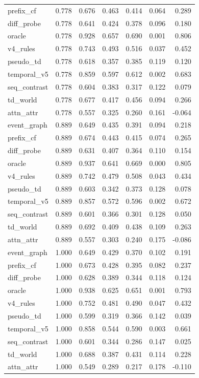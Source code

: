 \documentclass{article}
\begin{document}
\begin{longtable}{@{}lrrrrrr@{}}
prefix\_cf & 0.778 & 0.676 & 0.463 & 0.414 & 0.064 & 0.289 \\
diff\_probe & 0.778 & 0.641 & 0.424 & 0.378 & 0.096 & 0.180 \\
oracle & 0.778 & 0.928 & 0.657 & 0.690 & 0.001 & 0.806 \\
v4\_rules & 0.778 & 0.743 & 0.493 & 0.516 & 0.037 & 0.452 \\
pseudo\_td & 0.778 & 0.618 & 0.357 & 0.385 & 0.119 & 0.120 \\
temporal\_v5 & 0.778 & 0.859 & 0.597 & 0.612 & 0.002 & 0.683 \\
seq\_contrast & 0.778 & 0.604 & 0.383 & 0.317 & 0.122 & 0.079 \\
td\_world & 0.778 & 0.677 & 0.417 & 0.456 & 0.094 & 0.266 \\
attn\_attr & 0.778 & 0.557 & 0.325 & 0.260 & 0.161 & -0.064 \\
event\_graph & 0.889 & 0.649 & 0.435 & 0.391 & 0.094 & 0.218 \\
prefix\_cf & 0.889 & 0.674 & 0.443 & 0.415 & 0.074 & 0.265 \\
diff\_probe & 0.889 & 0.631 & 0.407 & 0.364 & 0.110 & 0.154 \\
oracle & 0.889 & 0.937 & 0.641 & 0.669 & 0.000 & 0.805 \\
v4\_rules & 0.889 & 0.742 & 0.479 & 0.508 & 0.043 & 0.434 \\
pseudo\_td & 0.889 & 0.603 & 0.342 & 0.373 & 0.128 & 0.078 \\
temporal\_v5 & 0.889 & 0.857 & 0.572 & 0.596 & 0.002 & 0.672 \\
seq\_contrast & 0.889 & 0.601 & 0.366 & 0.301 & 0.128 & 0.050 \\
td\_world & 0.889 & 0.692 & 0.409 & 0.438 & 0.109 & 0.263 \\
attn\_attr & 0.889 & 0.557 & 0.303 & 0.240 & 0.175 & -0.086 \\
event\_graph & 1.000 & 0.649 & 0.429 & 0.370 & 0.102 & 0.191 \\
prefix\_cf & 1.000 & 0.673 & 0.428 & 0.395 & 0.082 & 0.237 \\
diff\_probe & 1.000 & 0.628 & 0.389 & 0.344 & 0.118 & 0.124 \\
oracle & 1.000 & 0.938 & 0.625 & 0.651 & 0.001 & 0.793 \\
v4\_rules & 1.000 & 0.752 & 0.481 & 0.490 & 0.047 & 0.432 \\
pseudo\_td & 1.000 & 0.599 & 0.319 & 0.366 & 0.142 & 0.039 \\
temporal\_v5 & 1.000 & 0.858 & 0.544 & 0.590 & 0.003 & 0.661 \\
seq\_contrast & 1.000 & 0.601 & 0.344 & 0.286 & 0.147 & 0.025 \\
td\_world & 1.000 & 0.688 & 0.387 & 0.431 & 0.114 & 0.228 \\
attn\_attr & 1.000 & 0.549 & 0.289 & 0.217 & 0.178 & -0.110 \\
\bottomrule
\end{longtable}
\end{document}
